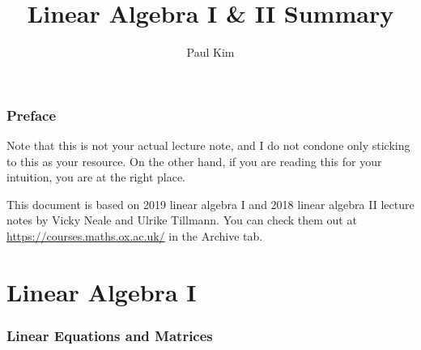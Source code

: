 \documentclass[a4paper]{article}
\title{Linear Algebra I \& II Summary}
\author{Paul Kim}
\begin{document}
\maketitle

\section*{Preface}
Note that this is not your actual lecture note,
and I do not condone only sticking to this as your resource.
On the other hand, if you are reading this for your intuition,
you are at the right place.

This document is based on 2019 linear algebra I and 2018 linear algebra II lecture notes by Vicky Neale and Ulrike Tillmann.
You can check them out at \url{https://courses.maths.ox.ac.uk/} in the Archive tab.

\newpage
\part{Linear Algebra I}
\newpage

\section{Linear Equations and Matrices}
\end{document}
